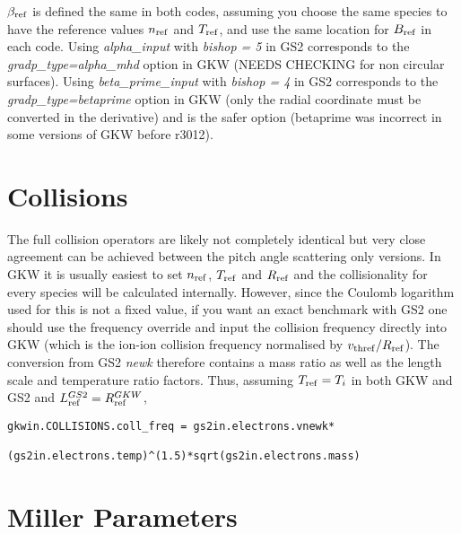 \documentclass[a4paper,10pt]{article}
\newcommand{\name}[1]{\textsl{#1}} %
\begin{document}
$\beta_{\rm ref}$ is defined the same in both codes, assuming you choose the same species to have the reference values $n_{\rm ref}$ and $T_{\rm ref}$, and use the same location for $B_{\rm ref}$ in each code.   Using \name{alpha\_input} with \name{bishop = 5} in GS2 corresponds to the \name{gradp\_type=alpha\_mhd} option in GKW (NEEDS CHECKING for non circular surfaces). Using \name{beta\_prime\_input} with \name{bishop = 4} in GS2 corresponds to the \name{gradp\_type=betaprime} option in GKW (only the radial coordinate must be converted in the derivative) and is the safer option (betaprime was incorrect in some versions of GKW before r3012).

\section{Collisions}

The full collision operators are likely not completely identical but very close agreement can be achieved between the pitch angle scattering only versions.  In GKW it is usually easiest to set $n_{\rm ref}$, $T_{\rm ref}$ and $R_{\rm ref}$ and the collisionality for every species will be calculated internally.  However, since the Coulomb logarithm used for this is not a fixed value, if you want an exact benchmark with GS2 one should use the frequency override and input the collision frequency directly into GKW (which is the ion-ion collision frequency normalised by $v_{\rm thref} / R_{\rm ref}$).  The conversion from GS2 \name{newk} therefore contains a mass ratio as well as the length scale and temperature ratio factors.  Thus, assuming  $T_{\rm ref}=T_i$ in both GKW and GS2 and $L^{GS2}_{\rm ref} = R^{GKW}_{\rm ref}$, 
\begin{verbatim}
gkwin.COLLISIONS.coll_freq = gs2in.electrons.vnewk*
                             (gs2in.electrons.temp)^(1.5)*sqrt(gs2in.electrons.mass)
\end{verbatim}


\section{Miller Parameters}
\end{document}
